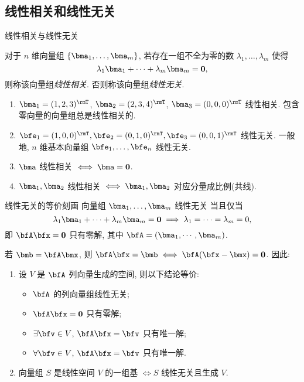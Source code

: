 \subsection{线性相关和线性无关}
\begin{frame}{线性相关与线性无关}
	\onslide<+->
	\begin{definition}
		对于 $n$ 维向量组 $\{\bma_1,\dots,\bma_m\}$,
		若存在一组\alert{不全为零}的数 $\lambda_1,\dots,\lambda_m$ 使得
		\[\lambda_1\bma_1+\dots+\lambda_m\bma_m={\bf0},\]
		则称该向量组\emph{线性相关}.
		否则称该向量组\emph{线性无关}.
	\end{definition}
	\onslide<+->
	\begin{example}
		\begin{enumerate}
			\item $\bma_1=(1,2,3)^\rmT$, $\bma_2=(2,3,4)^\rmT$, $\bma_3=(0,0,0)^\rmT$ 线性相关.
			\alert{包含零向量的向量组总是线性相关的}.
			\item $\bfe_1=(1,0,0)^\rmT,\bfe_2=(0,1,0)^\rmT,\bfe_3=(0,0,1)^\rmT$ 线性无关.
			一般地, \alert{$n$ 维基本向量组 $\bfe_1,\dots,\bfe_n$ 线性无关}.
			\item $\bma$ 线性相关 $\iff \bma={\bf0}$.
			\item $\bma_1,\bma_2$ 线性相关 $\iff \bma_1,\bma_2$ 对应分量成比例(共线).
		\end{enumerate}
	\end{example}
\end{frame}


\begin{frame}{线性无关的等价刻画}
	\onslide<+->
	向量组 $\bma_1,\dots,\bma_m$ 线性无关%
	\onslide<+->%
	当且仅当
	\[\lambda_1\bma_1+\dots+\lambda_m\bma_m={\bf0}\implies
	\lambda_1=\cdots=\lambda_m=0,\]
	\onslide<+->
	即 $\bfA\bfx={\bf0}$ 只有零解, 其中 $\bfA=(\bma_1,\cdots,\bma_m)$.

	\onslide<+->
	若 $\bmb=\bfA\bmx$, 则 $\bfA\bfx=\bmb\iff \bfA(\bfx-\bmx)={\bf0}$.
	\onslide<+->
	因此:
	\begin{theorem}
		\begin{enumerate}
			\item 设 $V$ 是 $\bfA$ 列向量生成的空间, 则以下结论等价:
			\begin{itemize}
				\item $\bfA$ 的列向量组线性无关;
				\item $\bfA\bfx={\bf0}$ 只有零解;
				\item $\exists\bfv\in V$, $\bfA\bfx=\bfv$ 只有唯一解;
				\item $\forall\bfv\in V$, $\bfA\bfx=\bfv$ 只有唯一解.
			\end{itemize}
			\item 向量组 $S$ 是线性空间 $V$ 的一组基 $\iff S$ 线性无关且生成 $V$.
		\end{enumerate}
	\end{theorem}
\end{frame}


